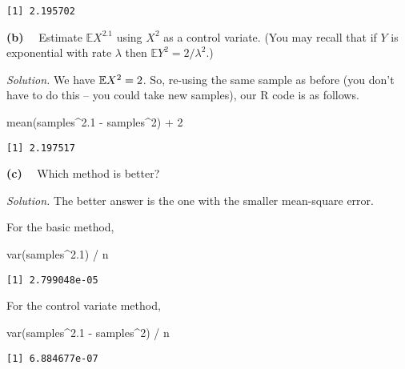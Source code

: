 \documentclass[
  letterpaper,
  DIV=11,
  numbers=noendperiod]{scrreprt}
\newenvironment{Shaded}{\begin{snugshade}}{\end{snugshade}}
\newcommand{\DecValTok}[1]{\textcolor[rgb]{0.68,0.00,0.00}{#1}}
\newcommand{\FloatTok}[1]{\textcolor[rgb]{0.68,0.00,0.00}{#1}}
\newcommand{\FunctionTok}[1]{\textcolor[rgb]{0.28,0.35,0.67}{#1}}
\newcommand{\NormalTok}[1]{\textcolor[rgb]{0.00,0.23,0.31}{#1}}
\newcommand{\SpecialCharTok}[1]{\textcolor[rgb]{0.37,0.37,0.37}{#1}}
\theoremstyle{plain}
\theoremstyle{definition}
\theoremstyle{definition}
\theoremstyle{remark}
\begin{document}
\begin{verbatim}
[1] 2.195702
\end{verbatim}

\textbf{(b)} ~~Estimate \(\mathbb EX^{2.1}\) using \(X^2\) as a control
variate. (You may recall that if \(Y\) is exponential with rate
\(\lambda\) then \(\mathbb EY^2 = 2/\lambda^2\).)

\emph{Solution.} We have \(\mathbb{E} X^2 = 2\). So, re-using the same sample
as before (you don't have to do this -- you could take new samples), our
R code is as follows.

\begin{Shaded}
\begin{Highlighting}[]
\FunctionTok{mean}\NormalTok{(samples}\SpecialCharTok{\^{}}\FloatTok{2.1} \SpecialCharTok{{-}}\NormalTok{ samples}\SpecialCharTok{\^{}}\DecValTok{2}\NormalTok{) }\SpecialCharTok{+} \DecValTok{2}
\end{Highlighting}
\end{Shaded}

\begin{verbatim}
[1] 2.197517
\end{verbatim}

\textbf{(c)} ~~Which method is better?

\emph{Solution.} The better answer is the one with the smaller
mean-square error.

For the basic method,

\begin{Shaded}
\begin{Highlighting}[]
\FunctionTok{var}\NormalTok{(samples}\SpecialCharTok{\^{}}\FloatTok{2.1}\NormalTok{) }\SpecialCharTok{/}\NormalTok{ n}
\end{Highlighting}
\end{Shaded}

\begin{verbatim}
[1] 2.799048e-05
\end{verbatim}

For the control variate method,

\begin{Shaded}
\begin{Highlighting}[]
\FunctionTok{var}\NormalTok{(samples}\SpecialCharTok{\^{}}\FloatTok{2.1} \SpecialCharTok{{-}}\NormalTok{ samples}\SpecialCharTok{\^{}}\DecValTok{2}\NormalTok{) }\SpecialCharTok{/}\NormalTok{ n}
\end{Highlighting}
\end{Shaded}

\begin{verbatim}
[1] 6.884677e-07
\end{verbatim}
\end{document}
